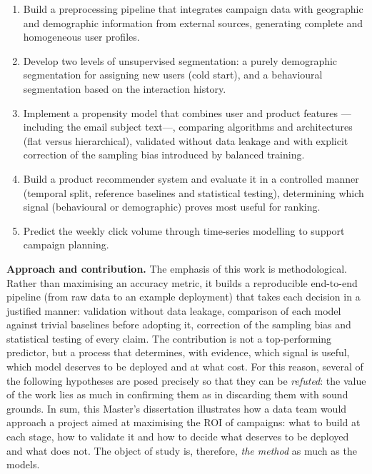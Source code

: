 \begin{enumerate}
    \item Build a preprocessing pipeline that integrates campaign data with geographic and demographic information from external sources, generating complete and homogeneous user profiles.
    \item Develop two levels of unsupervised segmentation: a purely demographic segmentation for assigning new users (cold start), and a behavioural segmentation based on the interaction history.
    \item Implement a propensity model that combines user and product features ---including the email subject text---, comparing algorithms and architectures (flat versus hierarchical), validated without data leakage and with explicit correction of the sampling bias introduced by balanced training.
    \item Build a product recommender system and evaluate it in a controlled manner (temporal split, reference baselines and statistical testing), determining which signal (behavioural or demographic) proves most useful for ranking.
    \item Predict the weekly click volume through time-series modelling to support campaign planning.
\end{enumerate}

\medskip
\noindent\textbf{Approach and contribution.} The emphasis of this work is methodological. Rather than maximising an accuracy metric, it builds a reproducible end-to-end pipeline (from raw data to an example deployment) that takes each decision in a justified manner: validation without data leakage, comparison of each model against trivial baselines before adopting it, correction of the sampling bias and statistical testing of every claim. The contribution is not a top-performing predictor, but a process that determines, with evidence, which signal is useful, which model deserves to be deployed and at what cost. For this reason, several of the following hypotheses are posed precisely so that they can be \emph{refuted}: the value of the work lies as much in confirming them as in discarding them with sound grounds. In sum, this Master's dissertation illustrates how a data team would approach a project aimed at maximising the ROI of campaigns: what to build at each stage, how to validate it and how to decide what deserves to be deployed and what does not. The object of study is, therefore, \emph{the method} as much as the models.

